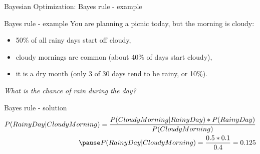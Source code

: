 \begin{frame}[c]{Bayesian Optimization: Bayes rule - example}

\begin{block}{Bayes rule - example}
    You are planning a picnic today, but the morning is cloudy: \pause
    \begin{itemize}
        \item 50\% of all rainy days start off cloudy, \pause
        \item cloudy mornings are common (about 40\% of days start cloudy), \pause
        \item it is a dry month (only 3 of 30 days tend to be rainy, or 10\%). \pause
    \end{itemize}
    
    \emph{What is the chance of rain during the day?}
\end{block}

 \pause

\begin{block}{Bayes rule - solution}
	\begin{equation*}
	\begin{aligned}
	    P(RainyDay \vert CloudyMorning) = \frac{P(CloudyMorning \vert RainyDay) * P(RainyDay)}{P(CloudyMorning)} \\  \pause
	    P(RainyDay \vert CloudyMorning) = \frac{0.5 * 0.1}{0.4} = 0.125
	\end{aligned}
	\end{equation*}
\end{block}

        
\end{frame}


